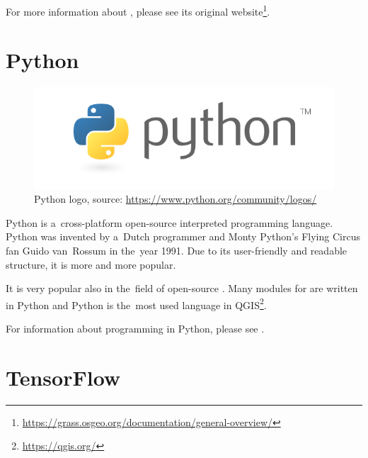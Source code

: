 For more information about  , please see its original 
website\footnote{\url{https://grass.osgeo.org/documentation/general-overview/}}.

\section{Python}
\label{python}

\begin{figure}[H]
   \centering
	\includegraphics[width=\linewidth]{./pictures/python-logo.png}
	\caption[Python logo]{Python logo, source: \url{https://www.python.org/community/logos/}}
      \label{fig:python-logo}
\end{figure}

Python is a~cross-platform open-source interpreted programming language. Python 
was invented by a~Dutch programmer and Monty Python's Flying Circus fan Guido 
van~Rossum in the~year 1991. Due to its user-friendly and readable structure, it is 
more and more popular.

It is very popular also in the~field of open-source . Many modules for 
  are written in Python and Python is the~most used language
in QGIS\footnote{\url{https://qgis.org/}}.

For information about programming in Python, please see \cite{diveintopython}.

\section{TensorFlow}
\label{tf}

